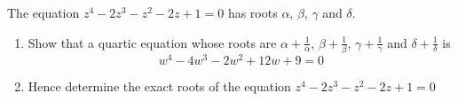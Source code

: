 \documentclass[leqno]{article}
\begin{document}
\begin{enumerate}[
  label=\textbf{\arabic*.},
  leftmargin=*,
  topsep=0pt,
  partopsep=0pt,
  parsep=0pt
]
\newpage

\questionitem

The equation $z^4-2z^3-z^2-2z+1=0$ has roots $\alpha$, $\beta$, $\gamma$ and $\delta$. \\

\begin{enumerate}[label=\textbf{(\alph*)}]
  \item Show that a quartic equation whose roots are $\alpha+\frac{1}{\alpha}$, $\beta+\frac{1}{\beta}$, $\gamma+\frac{1}{\gamma}$ and $\delta+\frac{1}{\delta}$ is
  \[
  w^4-4w^3-2w^2+12w+9=0
  \]
  \item Hence determine the exact roots of the equation $z^4-2z^3-z^2-2z+1=0$  \\
\end{enumerate}
\end{enumerate}
\end{document}
